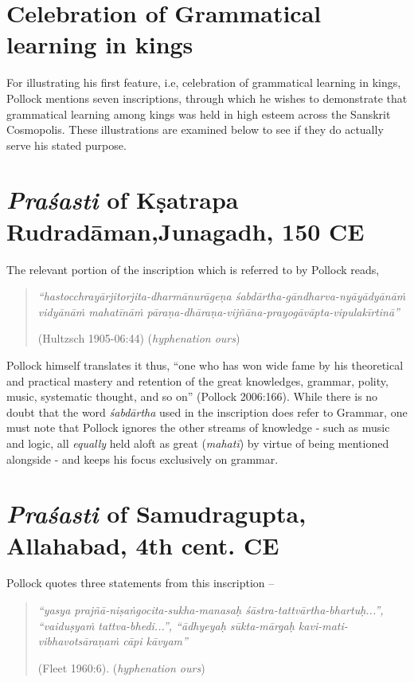 \section*{Celebration of Grammatical learning in kings}

For illustrating his first feature, i.e, celebration of grammatical learning in kings, Pollock mentions seven inscriptions, through which he wishes to demonstrate that grammatical learning among kings was held in high esteem across the Sanskrit Cosmopolis. These illustrations are examined below to see if they do actually serve his stated purpose. 

\section{{\sl\bfseries Praśasti} of Kṣatrapa Rudradāman,\newline Junagadh, 150 CE}\label{chap3-sec1}

The relevant portion of the inscription which is referred to by Pollock reads,
\begin{quote}
{{\sl ``hastocchrayārjitorjita-dharmānurāgeṇa śabdārtha-gāndharva-nyāyādyānāṁ vidyānāṁ mahatīnāṁ pāraṇa-dhāraṇa-vijñāna-prayogāvāpta-vipulakīrtinā''}}

\hfill (Hultzsch 1905-06:44) ({\sl hyphenation ours})
\end{quote}

Pollock himself translates it thus, ``one who has won wide fame by his theoretical and practical mastery and retention of the great knowledges, grammar, polity, music, systematic thought, and so on'' (Pollock 2006:166). While there is no doubt that the word {\sl śabdārtha} used in the inscription does refer to Grammar, one must note that Pollock ignores the other streams of knowledge - such as music and logic, all {\sl equally} held aloft as great ({\sl mahatī}) by virtue of being mentioned alongside - and keeps his focus exclusively on grammar. 

\section{{\sl\bfseries Praśasti} of Samudragupta, Allahabad, 4th cent. CE}\label{chap3-sec2}

Pollock quotes three statements from this inscription -- 
\begin{quote}
{{\sl ``yasya prajñā-niṣaṅgocita-sukha-manasaḥ śāstra-tattvārtha-bhartuḥ...'', ``vai\-duṣyaṁ tattva-bhedi...'', ``ādhyeyaḥ sūkta-mārgaḥ kavi-mati-vibhavotsāraṇaṁ cāpi kāvyam''}}

\hfill (Fleet 1960:6). ({\sl hyphenation ours}) 
\end{quote}

